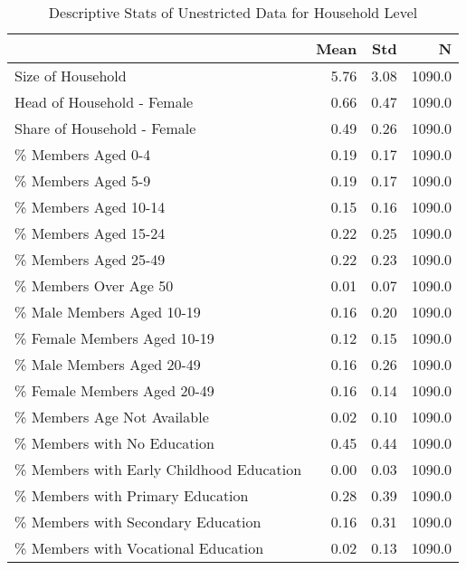 \begin{longtable}{lrrr}
\caption{Descriptive Stats of  Unestricted Data for Household Level}
\label{table:7}
\\\hline
{} &  Mean &   Std &       N \\
\hline
\endhead

\hline
\endfoot
Size of Household                                  &  5.76 &  3.08 &  1090.0 \\
Head of Household - Female                         &  0.66 &  0.47 &  1090.0 \\
Share of Household - Female                        &  0.49 &  0.26 &  1090.0 \\
\% Members Aged 0-4                                 &  0.19 &  0.17 &  1090.0 \\
\% Members Aged 5-9                                 &  0.19 &  0.17 &  1090.0 \\
\% Members Aged 10-14                               &  0.15 &  0.16 &  1090.0 \\
\% Members Aged 15-24                               &  0.22 &  0.25 &  1090.0 \\
\% Members Aged 25-49                               &  0.22 &  0.23 &  1090.0 \\
\% Members Over Age 50                              &  0.01 &  0.07 &  1090.0 \\
\% Male Members Aged 10-19                          &  0.16 &  0.20 &  1090.0 \\
\% Female Members Aged 10-19                        &  0.12 &  0.15 &  1090.0 \\
\% Male Members Aged 20-49                          &  0.16 &  0.26 &  1090.0 \\
\% Female Members Aged 20-49                        &  0.16 &  0.14 &  1090.0 \\
\% Members Age Not Available                        &  0.02 &  0.10 &  1090.0 \\
\% Members with No Education                        &  0.45 &  0.44 &  1090.0 \\
\% Members with Early Childhood Education           &  0.00 &  0.03 &  1090.0 \\
\% Members with Primary Education                   &  0.28 &  0.39 &  1090.0 \\
\% Members with Secondary Education                 &  0.16 &  0.31 &  1090.0 \\
\% Members with Vocational Education                &  0.02 &  0.13 &  1090.0 \\

\end{longtable}

